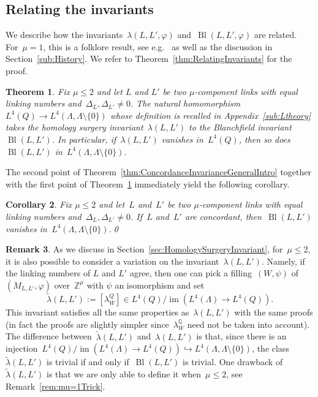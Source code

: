 \documentclass[10.9pt,a4paper]{amsart}
\newtheorem{theorem}{Theorem}[section]
\newtheorem{corollary}[theorem]{Corollary}
\theoremstyle{definition}
\newtheorem{remark}[theorem]{Remark}
\theoremstyle{remark}
\newcommand{\Z}{\mathbb{Z}}
\newcommand{\Q}{\mathbb{Q}}
\newcommand{\Bl}{\operatorname{Bl}}
\newcommand{\im}{\operatorname{im}}
\begin{document}
\subsection{Relating the invariants}

We describe how the invariants~$\lambda(L,L',\varphi)$ and~$\Bl(L,L',\varphi)$ are related.
For~$\mu=1$,  this is a folklore result,  see e.g.~\cite{LitherlandCobordism} as well as the discussion in Section~\ref{sub:History}.
We refer to Theorem~\ref{thm:RelatingInvariants} for the proof. 




\begin{theorem}
\label{thm:RelatingInvariantsIntro}
Fix $\mu \leq 2$ and let $L$ and $L'$ be two $\mu$-component links with equal linking numbers and~$\Delta_L,\Delta_{L'} \neq 0$.
The natural homomorphism~$L^4(Q) \to L^4(\Lambda,\Lambda \setminus \{0\})$ whose definition is recalled in Appendix~\ref{sub:Ltheory}
takes the homology surgery invariant~$\lambda(L,L')$ to the Blanchfield invariant~$\Bl(L,L')$.
In particular, if~$\lambda(L,L')$ vanishes in~$L^4(Q)$,  then so does~$\Bl(L,L')$ in~$L^4(\Lambda,\Lambda \setminus \{0\})$.
\end{theorem}


The second point of Theorem~\ref{thm:ConcordanceInvarianceGeneralIntro}  together with the first point of Theorem~\ref{thm:RelatingInvariantsIntro}
immediately yield the following corollary.

\begin{corollary}
\label{cor:Bl=0}
Fix $\mu \leq 2$ and let~$L$ and~$L'$ be two $\mu$-component links with equal linking numbers and~$\Delta_L,\Delta_{L'} \neq 0$.
If~$L$ and~$L'$ are concordant, then~$\Bl(L,L')$ vanishes in~$L^4(\Lambda,\Lambda \setminus \{0\})$.\qed
\end{corollary}





\begin{remark}
\label{rem:OtherlambdaIntro}
As we discuss in Section~\ref{sec:HomologySurgeryInvariant}, for~$\mu \leq 2$,  it is also possible to consider a variation on the invariant~$\lambda(L,L')$.
Namely,  if the linking numbers of $L$ and $L'$ agree, then one can pick a filling~$(W,\psi)$ of~$(M_{L,L'},\varphi)$ over~$\Z^\mu$ with $\psi$ an isomorphism and set
$$\widetilde{\lambda}(L,L'):=[\lambda_W^Q] \in L^4(Q)/\im(L^4(\Lambda) \to L^4(Q)).$$
This invariant satisfies all the same properties as~$\lambda(L,L')$ with the same proofs (in fact the proofs are slightly simpler since~$\lambda_W^\Q$ need not be taken into account).
The difference between~$\widetilde{\lambda}(L,L')$ and~$\lambda(L,L')$ is that,  since there is an injection~$L^4(Q)/\im(L^4(\Lambda) \to L^4(Q)) \hookrightarrow L^4(\Lambda,\Lambda\setminus \{0\})$,  the class~$\widetilde{\lambda}(L,L')$ is trivial if and only if~$\Bl(L,L')$ is trivial.
One drawback of~$\widetilde{\lambda}(L,L')$ is that we are only able to define it when~$\mu \leq 2$, see Remark~\ref{rem:mu=1Trick}.
\end{remark}
\end{document}
